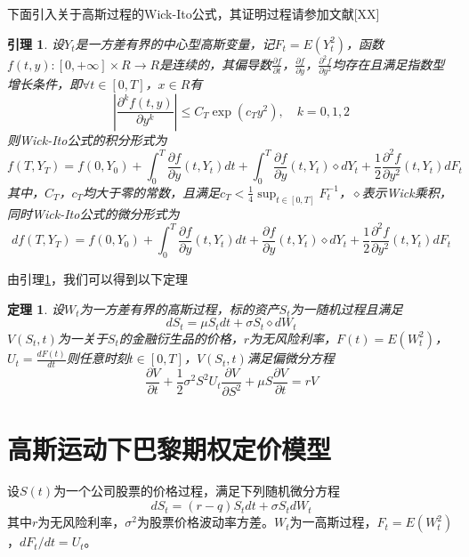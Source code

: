 \documentclass{ctexart} %
\newtheorem{theorem}[definition]{\hspace{2em}定理}
\newtheorem{lemma}[definition]{\hspace{2em}引理}
\begin{document}
下面引入关于高斯过程的Wick-Ito公式，其证明过程请参加文献[XX]
\begin{lemma}
\label{x1}
设$Y_t$是一方差有界的中心型高斯变量，记$F_t=E(Y^2_t)$，函数$f(t,y):[0,+\infty]\times R\rightarrow R$是连续的，其偏导数$\frac{\partial f}{\partial t}$，$\frac{\partial f}{\partial y}$，$\frac{\partial^2 f}{\partial y^2}$均存在且满足指数型增长条件，即$\forall t\in[0,T]$，$x \in R$有
\begin{equation}
|\frac{\partial^k f(t,y)}{\partial y^k}|\leq C_T\exp(c_Ty^2),\quad k=0,1,2
\end{equation}
则Wick-Ito公式的积分形式为
\begin{equation}
f(T,Y_T)=f(0,Y_0)+\int^T_0\frac{\partial f}{\partial y}(t,Y_t)dt+\int^T_0\frac{\partial f}{\partial y}(t,Y_t)\diamond dY_t+\frac{1}{2}\frac{\partial^2 f}{\partial y^2}(t,Y_t)dF_t
\end{equation}
其中，$C_T$，$c_T$均大于零的常数，且满足$c_T<\frac{1}{4}\sup_{t\in[0,T]}F_t^{-1}$，$\diamond$表示Wick乘积，同时Wick-Ito公式的微分形式为
\begin{equation}
df(T,Y_T)=f(0,Y_0)+\int^T_0\frac{\partial f}{\partial y}(t,Y_t)dt+\frac{\partial f}{\partial y}(t,Y_t)\diamond dY_t+\frac{1}{2}\frac{\partial^2 f}{\partial y^2}(t,Y_t)dF_t
\end{equation}
\end{lemma}

由引理\ref{x1}，我们可以得到以下定理
\begin{theorem}
设$W_t$为一方差有界的高斯过程，标的资产$S_t$为一随机过程且满足
\begin{equation}
dS_t=\mu S_tdt+\sigma S_t\diamond dW_t
\end{equation}
$V(S_t,t)$为一关于$S_t$的金融衍生品的价格，$r$为无风险利率，$F(t)=E(W^2_t)$，$U_t=\frac{dF(t)}{dt}$则任意时刻$t\in[0,T]$，$V(S_t,t)$满足偏微分方程
\begin{equation}
\label{f1}
\frac{\partial V}{\partial t}+\frac{1}{2}\sigma^2S^2U_t\frac{\partial V}{\partial S^2}+\mu S\frac{\partial V}{\partial t}=rV
\end{equation}


\end{theorem}


\section{高斯运动下巴黎期权定价模型}
设$S(t)$为一个公司股票的价格过程，满足下列随机微分方程
\begin{equation}
dS_t=(r-q)S_t dt+\sigma S_t dW_t
\end{equation}
其中$r$为无风险利率，$\sigma^2$为股票价格波动率方差。$W_t$为一高斯过程，$F_t=E(W^2_t)$，$dF_t/dt=U_t$。
\end{document}
